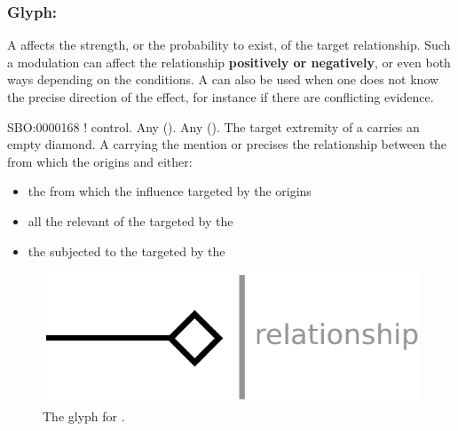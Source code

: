 \subsubsection{Glyph: }\label{sec:modulation}

A  affects the strength, or the probability to exist, of the target relationship. Such a modulation can affect the relationship \textbf{positively or negatively}, or even both ways depending on the conditions. A  can also be used when one does not know the precise direction of the effect, for instance if there are conflicting evidence.

\begin{glyphDescription}
 \glyphSboTerm SBO:0000168 ! control.
 \glyphOrigin Any  ().
 \glyphTarget Any  ().
 \glyphEndPoint The target extremity of a  carries an empty diamond.
 \glyphAux A  carrying the mention  or  precises the relationship between the  from which the  origins and either:
\begin{itemize}
\item the  from which the influence targeted by the  origins
\item all the relevant  of the  targeted by the 
\item the  subjected to the  targeted by the 
\end{itemize}
 \end{glyphDescription}

\begin{figure}[H]
  \centering
  \includegraphics[scale = 0.5]{images/modulation}
  \caption{The \ER glyph for .}
  \label{fig:modulation}
\end{figure}
 


